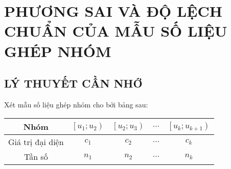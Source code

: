 \setcounter{section}{1}
\setcounter{dang}{0}
\section{PHƯƠNG SAI VÀ ĐỘ LỆCH CHUẨN CỦA MẪU SỐ LIỆU GHÉP NHÓM}
\subsection{LÝ THUYẾT CẦN NHỚ}
Xét mẫu số liệu ghép nhóm cho bởi bảng sau:
\begin{center}
	\begin{tabular}{|c|c|c|c|c|}
		\hline Nhóm             & {$\left[u_1; u_2\right)$} & {$\left[u_2; u_3\right)$} & $\ldots$ & {$\left[u_k; u_{k+1}\right)$} \\
		\hline Giá trị đại diện & $c_1$                     & $c_2$                     & $\ldots$ & $c_k$                         \\
		\hline Tần số           & $n_1$                     & $n_2$                     & $\ldots$ & $n_k$                         \\
		\hline
	\end{tabular}
\end{center}
